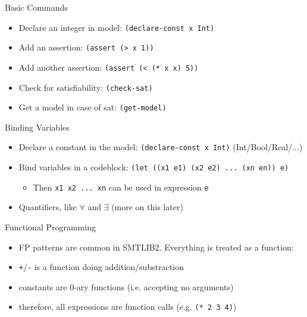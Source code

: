 \documentclass[10pt]{beamer}
\begin{document}
\begin{frame}{Basic Commands}
  \begin{itemize}[<+->]
    \item Declare an integer in model: \texttt{(declare-const x Int)}
    \item Add an assertion: \texttt{(assert (> x 1))}
    \item Add another assertion: \texttt{(assert (< (* x x) 5))}
    \item Check for satisfiability: \texttt{(check-sat)}
    \item Get a model in case of sat: \texttt{(get-model)}
  \end{itemize}
\end{frame}

\begin{frame}{Binding Variables}
  \begin{itemize}[<+->]
    \item Declare a constant in the model: \texttt{(declare-const x Int)} (Int/Bool/Real/...)
    \item Bind variables in a codeblock: \texttt{(let ((x1 e1) (x2 e2) ... (xn en)) e)}
          \begin{itemize}
            \item Then \texttt{x1 x2 ... xn} can be used in expression \texttt{e}
          \end{itemize}
    \item Quantifiers, like $\forall$ and $\exists$ (more on this later)
  \end{itemize}
\end{frame}

\begin{frame}{Functional Programming}
  \begin{itemize}[<+->]
    \item FP patterns are common in SMTLIB2. Everything is treated as a function:
    \item \texttt{+}/\texttt{-} is a function doing addition/substraction
    \item constants are 0-ary functions (i.e. accepting no arguments)
    \item therefore, all expressions are function calls (e.g. \texttt{(* 2 3 4)})
  \end{itemize}
\end{frame}
\end{document}
